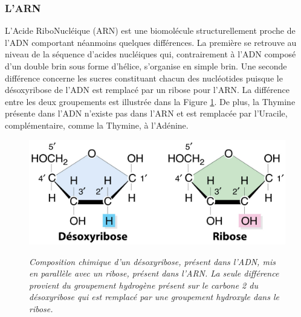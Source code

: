 \subsubsection{L'ARN}

L'Acide RiboNucléique (ARN) est une biomolécule structurellement proche de l'ADN comportant néanmoins quelques différences. La première se retrouve au niveau de la séquence d'acides nucléiques qui, contrairement à l'ADN composé d'un double brin sous forme d'hélice, s'organise en simple brin. Une seconde différence concerne les sucres constituant chacun des nucléotides puisque le désoxyribose de l'ADN est remplacé par un ribose pour l'ARN. La différence entre les deux groupements est illustrée dans la Figure \ref{Fig:desoxyribose_vs_ribose}. De plus, la Thymine présente dans l'ADN n'existe pas dans l'ARN et est remplacée par l'Uracile, complémentaire, comme la Thymine, à l'Adénine.

\begin{figure}
  \centering
  {\includegraphics[width=0.8\linewidth]{./figures/ch1/desoxyribose_vs_ribose}}
    \caption{\it Composition chimique d'un désoxyribose, présent dans l'ADN, mis en parallèle avec un ribose, présent dans l'ARN. La seule différence provient du groupement hydrogène présent sur le carbone 2 du désoxyribose qui est remplacé par une groupement hydroxyle dans le ribose.}
    \label{Fig:desoxyribose_vs_ribose}
  \hspace{0.2cm}
\end{figure}


